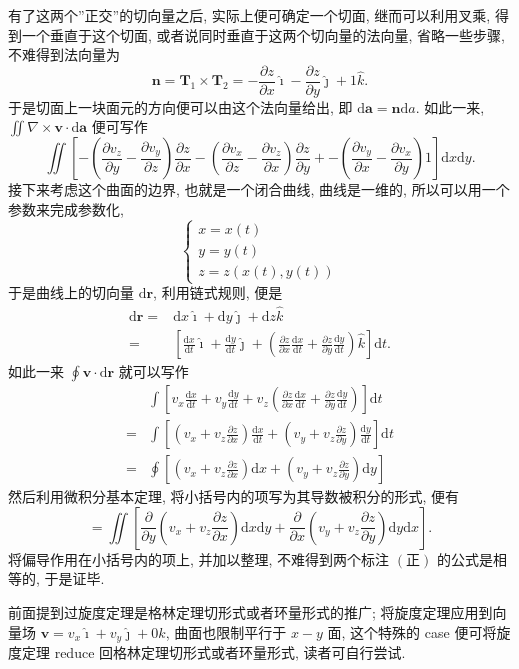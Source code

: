有了这两个''正交''的切向量之后, 实际上便可确定一个切面,
继而可以利用叉乘, 得到一个垂直于这个切面,
或者说同时垂直于这两个切向量的法向量, 省略一些步骤, 不难得到法向量为 \[
\boldsymbol{n}=\boldsymbol{T}_1\times \boldsymbol{T}_2=-\frac{\partial z}{\partial x}\hat{\imath}-\frac{\partial z}{\partial y}\hat{\jmath}+1\hat{k}.
\] 于是切面上一块面元的方向便可以由这个法向量给出, 即
$\mathrm{d}\boldsymbol{a}=\boldsymbol{n}\mathrm{d}a$. 如此一来,
$\iint\nabla\times\boldsymbol{v}\cdot\mathrm{d}\boldsymbol{a}$
便可写作 \[
\iint\left[-\left(\frac{\partial v_z}{\partial y}-\frac{\partial v_y}{\partial z}\right)\frac{\partial z}{\partial x}-\left(\frac{\partial v_x}{\partial z}-\frac{\partial v_z}{\partial x}\right)\frac{\partial z}{\partial y}+-\left(\frac{\partial v_y}{\partial x}-\frac{\partial v_x}{\partial y}\right)1\right]\mathrm{d}x\mathrm{d}y.\tag{正}
\] 接下来考虑这个曲面的边界, 也就是一个闭合曲线, 曲线是一维的,
所以可以用一个参数来完成参数化, \[
\begin{cases}
x=x(t)\\
y=y(t)\\
z=z(x(t),y(t))
\end{cases}
\] 于是曲线上的切向量 $\mathrm{d}\boldsymbol{r}$, 利用链式规则, 便是
\[
\begin{aligned}
\mathrm{d}\boldsymbol{r}=&\mathrm{d}x\hat{\imath}+\mathrm{d}y\hat{\jmath}+\mathrm{d}z\hat{k}\\
=&\left[\frac{\mathrm{d}x}{\mathrm{d}t}\hat{\imath}+\frac{\mathrm{d}y}{\mathrm{d}t}\hat{\jmath}+\left(\frac{\partial z}{\partial x}\frac{\mathrm{d}x}{\mathrm{d}t}+\frac{\partial z}{\partial y}\frac{\mathrm{d}y}{\mathrm{d}t}\right)\hat{k}\right]\mathrm{d}t.
\end{aligned}
\] 如此一来 $\oint\boldsymbol{v}\cdot\mathrm{d}\boldsymbol{r}$
就可以写作 \[
\begin{aligned}
&\int\left[v_x\frac{\mathrm{d}x}{\mathrm{d}t}+v_y\frac{\mathrm{d}y}{\mathrm{d}t}+v_z\left(\frac{\partial z}{\partial x}\frac{\mathrm{d}x}{\mathrm{d}t}+\frac{\partial z}{\partial y}\frac{\mathrm{d}y}{\mathrm{d}t}\right)\right]\mathrm{d}t\\
=&\int\left[\left(v_x+v_z\frac{\partial z}{\partial x}\right)\frac{\mathrm{d}x}{\mathrm{d}t}+\left(v_y+v_z\frac{\partial z}{\partial y}\right)\frac{\mathrm{d}y}{\mathrm{d}t}\right]\mathrm{d}t\\
=&\oint\left[\left(v_x+v_z\frac{\partial z}{\partial x}\right)\mathrm{d}x+\left(v_y+v_z\frac{\partial z}{\partial y}\right)\mathrm{d}y\right]
\end{aligned}
\] 然后利用微积分基本定理, 将小括号内的项写为其导数被积分的形式, 便有 \[
=\iint\left[\frac{\partial}{\partial y}\left(v_x+v_z\frac{\partial z}{\partial x}\right)\mathrm{d}x\mathrm{d}y+\frac{\partial}{\partial x}\left(v_y+v_z\frac{\partial z}{\partial y}\right)\mathrm{d}y\mathrm{d}x\right].\tag{正}
\] 将偏导作用在小括号内的项上, 并加以整理, 不难得到两个标注 $(\text{正})$
的公式是相等的, 于是证毕.

\begin{newquote}
前面提到过旋度定理是格林定理切形式或者环量形式的推广;
将旋度定理应用到向量场
$\boldsymbol{v}=v_x\hat{\imath}+v_y\hat{\jmath}+0\hat{k}$,
曲面也限制平行于 $x-y$ 面, 这个特殊的 case 便可将旋度定理 reduce
回格林定理切形式或者环量形式, 读者可自行尝试.
\end{newquote}
